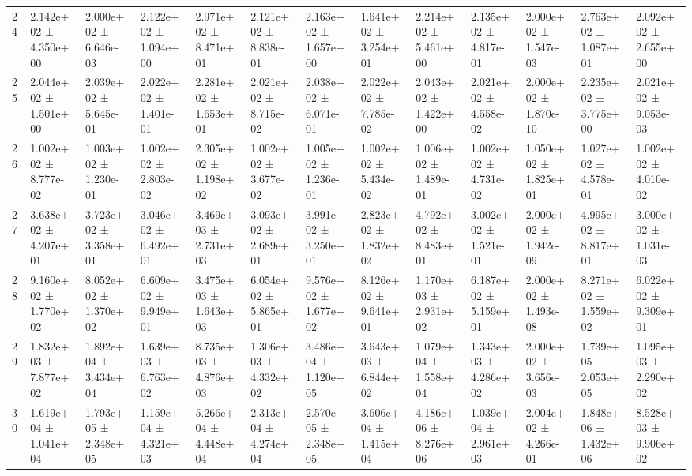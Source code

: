 \begin{table}
\begin{tabular}{lllllllllllll}
24 & 2.142e+02 ± 4.350e+00 & 2.000e+02 ± 6.646e-03 & 2.122e+02 ± 1.094e+00 & 2.971e+02 ± 8.471e+01 & 2.121e+02 ± 8.838e-01 & 2.163e+02 ± 1.657e+00 & 1.641e+02 ± 3.254e+01 & 2.214e+02 ± 5.461e+00 & 2.135e+02 ± 4.817e-01 & 2.000e+02 ± 1.547e-03 & 2.763e+02 ± 1.087e+01 & 2.092e+02 ± 2.655e+00 \\
25 & 2.044e+02 ± 1.501e+00 & 2.039e+02 ± 5.645e-01 & 2.022e+02 ± 1.401e-01 & 2.281e+02 ± 1.653e+01 & 2.021e+02 ± 8.715e-02 & 2.038e+02 ± 6.071e-01 & 2.022e+02 ± 7.785e-02 & 2.043e+02 ± 1.422e+00 & 2.021e+02 ± 4.558e-02 & 2.000e+02 ± 1.870e-10 & 2.235e+02 ± 3.775e+00 & 2.021e+02 ± 9.053e-03 \\
26 & 1.002e+02 ± 8.777e-02 & 1.003e+02 ± 1.230e-01 & 1.002e+02 ± 2.803e-02 & 2.305e+02 ± 1.198e+02 & 1.002e+02 ± 3.677e-02 & 1.005e+02 ± 1.236e-01 & 1.002e+02 ± 5.434e-02 & 1.006e+02 ± 1.489e-01 & 1.002e+02 ± 4.731e-02 & 1.050e+02 ± 1.825e+01 & 1.027e+02 ± 4.578e-01 & 1.002e+02 ± 4.010e-02 \\
27 & 3.638e+02 ± 4.207e+01 & 3.723e+02 ± 3.358e+01 & 3.046e+02 ± 6.492e+01 & 3.469e+03 ± 2.731e+03 & 3.093e+02 ± 2.689e+01 & 3.991e+02 ± 3.250e+01 & 2.823e+02 ± 1.832e+02 & 4.792e+02 ± 8.483e+01 & 3.002e+02 ± 1.521e-01 & 2.000e+02 ± 1.942e-09 & 4.995e+02 ± 8.817e+01 & 3.000e+02 ± 1.031e-03 \\
28 & 9.160e+02 ± 1.770e+02 & 8.052e+02 ± 1.370e+02 & 6.609e+02 ± 9.949e+01 & 3.475e+03 ± 1.643e+03 & 6.054e+02 ± 5.865e+01 & 9.576e+02 ± 1.677e+02 & 8.126e+02 ± 9.641e+01 & 1.170e+03 ± 2.931e+02 & 6.187e+02 ± 5.159e+01 & 2.000e+02 ± 1.493e-08 & 8.271e+02 ± 1.559e+02 & 6.022e+02 ± 9.309e+01 \\
29 & 1.832e+03 ± 7.877e+02 & 1.892e+04 ± 3.434e+04 & 1.639e+03 ± 6.763e+02 & 8.735e+03 ± 4.876e+03 & 1.306e+03 ± 4.332e+02 & 3.486e+04 ± 1.120e+05 & 3.643e+03 ± 6.844e+02 & 1.079e+04 ± 1.558e+04 & 1.343e+03 ± 4.286e+02 & 2.000e+02 ± 3.656e-03 & 1.739e+05 ± 2.053e+05 & 1.095e+03 ± 2.290e+02 \\
30 & 1.619e+04 ± 1.041e+04 & 1.793e+05 ± 2.348e+05 & 1.159e+04 ± 4.321e+03 & 5.266e+04 ± 4.448e+04 & 2.313e+04 ± 4.274e+04 & 2.570e+05 ± 2.348e+05 & 3.606e+04 ± 1.415e+04 & 4.186e+06 ± 8.276e+06 & 1.039e+04 ± 2.961e+03 & 2.004e+02 ± 4.266e-01 & 1.848e+06 ± 1.432e+06 & 8.528e+03 ± 9.906e+02 \\
\bottomrule
\end{tabular}
\end{table}
